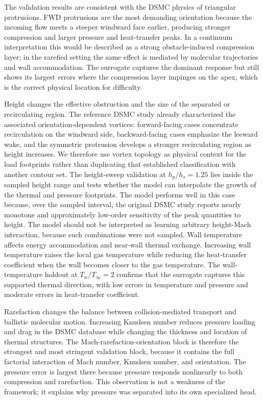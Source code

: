 \documentclass[aip,pof,preprint,floatfix,amsmath,amssymb]{revtex4-2}
\begin{document}
The validation results are consistent with the DSMC physics of triangular protrusions. FWD protrusions are the most demanding orientation because the incoming flow meets a steeper windward face earlier, producing stronger compression and larger pressure and heat-transfer peaks. In a continuum interpretation this would be described as a strong obstacle-induced compression layer; in the rarefied setting the same effect is mediated by molecular trajectories and wall accommodation. The surrogate captures the dominant response but still shows its largest errors where the compression layer impinges on the apex, which is the correct physical location for difficulty.

Height changes the effective obstruction and the size of the separated or recirculating region. The reference DSMC study already characterized the associated orientation-dependent vortices: forward-facing cases concentrate recirculation on the windward side, backward-facing cases emphasize the leeward wake, and the symmetric protrusion develops a stronger recirculating region as height increases. We therefore use vortex topology as physical context for the load footprints rather than duplicating that established classification with another contour set. The height-sweep validation at $h_p/h_s=1.25$ lies inside the sampled height range and tests whether the model can interpolate the growth of the thermal and pressure footprints. The model performs well in this case because, over the sampled interval, the original DSMC study reports nearly monotone and approximately low-order sensitivity of the peak quantities to height. The model should not be interpreted as learning arbitrary height-Mach interaction, because such combinations were not sampled. Wall temperature affects energy accommodation and near-wall thermal exchange. Increasing wall temperature raises the local gas temperature while reducing the heat-transfer coefficient when the wall becomes closer to the gas temperature. The wall-temperature holdout at $T_w/T_\infty=2$ confirms that the surrogate captures this supported thermal direction, with low errors in temperature and pressure and moderate errors in heat-transfer coefficient.

Rarefaction changes the balance between collision-mediated transport and ballistic molecular motion. Increasing Knudsen number reduces pressure loading and drag in the DSMC database while changing the thickness and location of thermal structures. The Mach-rarefaction-orientation block is therefore the strongest and most stringent validation block, because it contains the full factorial interaction of Mach number, Knudsen number, and orientation. The pressure error is largest there because pressure responds nonlinearly to both compression and rarefaction. This observation is not a weakness of the framework; it explains why pressure was separated into its own specialized head.
\end{document}
